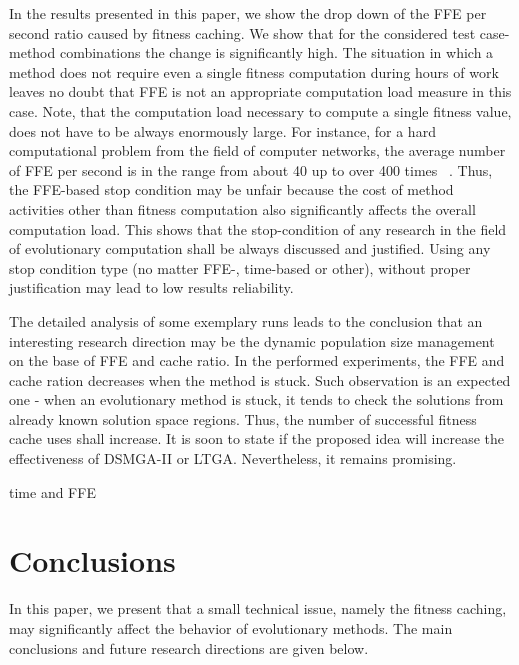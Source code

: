 In the results presented in this paper, we show the drop down of the FFE per second ratio caused by fitness caching. We show that for the considered test case-method combinations the change is significantly high. The situation in which a method does not require even a single fitness computation during hours of work leaves no doubt that FFE is not an appropriate computation load measure in this case. Note, that the computation load necessary to compute a single fitness value, does not have to be always enormously large. For instance, for a hard computational problem from the field of computer networks, the average number of FFE per second is in the range from about 40 up to over 400 times ~\cite{MuPPetSeon}. Thus, the FFE-based stop condition may be unfair because the cost of method activities other than fitness computation also significantly affects the overall computation load. This shows that the stop-condition of any research in the field of evolutionary computation shall be always discussed and justified. Using any stop condition type (no matter FFE-, time-based or other), without proper justification may lead to low results reliability.\par

The detailed analysis of some exemplary runs leads to the conclusion that an interesting research direction may be the dynamic population size management on the base of FFE and cache ratio. In the performed experiments, the FFE and cache ration decreases when the method is stuck. Such observation is an expected one - when an evolutionary method is stuck, it tends to check the solutions from already known solution space regions. Thus, the number of successful fitness cache uses shall increase. It is soon to state if the proposed idea will increase the effectiveness of DSMGA-II or LTGA. Nevertheless, it remains promising.\par


time and FFE


\section{Conclusions}

In this paper, we present that a small technical issue, namely the fitness caching, may significantly affect the behavior of evolutionary methods. The main conclusions and future research directions are given below.

